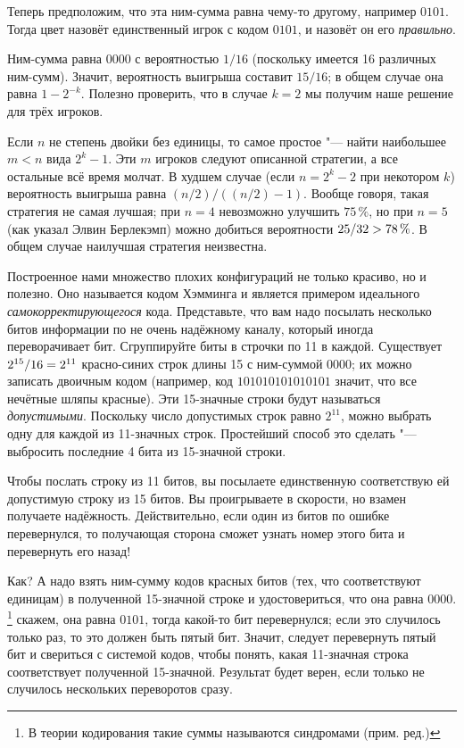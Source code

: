 \documentclass[twoside]{book}
\begin{document}
Теперь  предположим, что эта ним-сумма равна чему-то другому, например $0101$.
Тогда цвет назовёт единственный игрок с кодом  $0101$, и назовёт он его \emph{правильно}.

Ним-сумма равна $0000$ с вероятностью $1/16$ (поскольку имеется 16 различных ним-сумм).
Значит, вероятность выигрыша составит $15/16$;
в общем случае она равна $1-2^{-k}$.
Полезно проверить, что в случае $k=2$ мы получим наше решение для трёх игроков.

Если $n$ не  степень двойки без единицы, то самое простое "--- найти наибольшее  $m<n$ вида $2^k-1$.
Эти $m$ игроков следуют описанной стратегии, а все остальные всё время молчат.
В худшем случае (если $n=2^k-2$ при некотором $k$) вероятность выигрыша равна $(n/2)/((n/2)-1)$.
Вообще говоря, такая стратегия не самая лучшая;
при $n=4$ невозможно улучшить $75\,\%$, но при $n=5$ (как указал Элвин Берлекэмп) можно добиться вероятности $25/32\z>78\,\%$.
В общем случае наилучшая стратегия неизвестна.
\heart

Построенное нами множество плохих конфигураций не только красиво, но и полезно.
Оно называется кодом Хэмминга и является примером идеального  \emph{самокорректирующегося} кода.
Представьте, что вам надо посылать несколько битов информации по не очень надёжному каналу, который иногда переворачивает бит.
Сгруппируйте биты в строчки по 11 в каждой.
Существует $2^{15}/16\z=2^{11}$ красно-синих строк длины 15 с ним-суммой $0000$;
их можно записать двоичным кодом (например, код $101010101010101$ значит, что все нечётные шляпы красные).
Эти 15-значные строки будут называться \emph{допустимыми}.
Поскольку число допустимых строк равно $2^{11}$, можно выбрать одну для каждой из 11-значных строк.
Простейший способ это сделать "--- выбросить последние 4 бита из 15-значной строки.

Чтобы послать строку из 11 битов, вы посылаете единственную соответствую ей допустимую строку из 15 битов.
Вы проигрываете в скорости, но взамен получаете надёжность.
Действительно, если один из битов по ошибке перевернулся, то получающая сторона сможет узнать номер этого бита и перевернуть его назад!

Как? А надо взять ним-сумму кодов красных битов (тех, что соответствуют единицам) в полученной 15-значной строке и удостовериться, что она равна $0000$. \footnote{В теории кодирования такие суммы называются синдромами (прим. ред.)}
 скажем, она равна $0101$,
тогда какой-то бит перевернулся;
если это случилось только раз, то это должен быть пятый бит.
Значит, следует перевернуть пятый бит и свериться с системой кодов, чтобы понять, какая 11-значная строка соответствует полученной 15-значной.
Результат будет верен, если только не случилось нескольких переворотов сразу.
\end{document}
